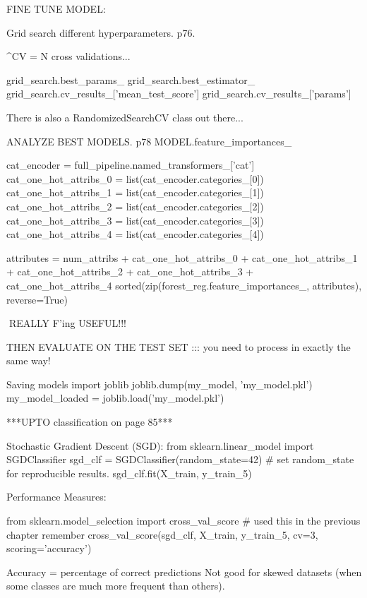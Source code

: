 FINE TUNE MODEL:

Grid search different hyperparameters. p76.





^CV = N cross validations...

grid_search.best_params_
grid_search.best_estimator_
grid_search.cv_results_['mean_test_score']
grid_search.cv_results_['params']

There is also a RandomizedSearchCV class out there...

ANALYZE BEST MODELS. p78
MODEL.feature_importances_

cat_encoder = full_pipeline.named_transformers_['cat']
cat_one_hot_attribs_0 = list(cat_encoder.categories_[0])
cat_one_hot_attribs_1 = list(cat_encoder.categories_[1])
cat_one_hot_attribs_2 = list(cat_encoder.categories_[2])
cat_one_hot_attribs_3 = list(cat_encoder.categories_[3])
cat_one_hot_attribs_4 = list(cat_encoder.categories_[4])

attributes = num_attribs + cat_one_hot_attribs_0 + cat_one_hot_attribs_1 + cat_one_hot_attribs_2 + cat_one_hot_attribs_3 + cat_one_hot_attribs_4
sorted(zip(forest_reg.feature_importances_, attributes), reverse=True)

^^^REALLY F'ing USEFUL!!!

THEN EVALUATE ON THE TEST SET ::: you need to process in exactly the same way!

Saving models
import joblib
joblib.dump(my_model, 'my_model.pkl')
my_model_loaded = joblib.load('my_model.pkl')












***UPTO classification on page 85***

Stochastic Gradient Descent (SGD):
from sklearn.linear_model import SGDClassifier
sgd_clf = SGDClassifier(random_state=42) # set random_state for reproducible results.
sgd_clf.fit(X_train, y_train_5)

Performance Measures:

from sklearn.model_selection import cross_val_score # used this in the previous chapter remember
cross_val_score(sgd_clf, X_train, y_train_5, cv=3, scoring='accuracy')

Accuracy = percentage of correct predictions
Not good for skewed datasets (when some classes are much more frequent than others).

